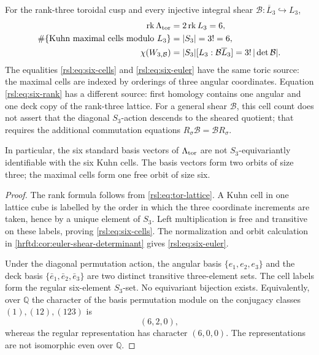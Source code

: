 \begin{theorem}
\label{rsl:thm:three-sixes}
For the rank-three toroidal cusp and every injective integral shear
\(\mathcal B:\overline L_3\hookrightarrow L_3\),
\begin{align}
 \operatorname{rk}\Lambda_{\rm tor}&=2\operatorname{rk}L_3=6,
 \label{rsl:eq:six-rank}\\
 \#\{\text{Kuhn maximal cells modulo }L_3\}&=|S_3|=3!=6,
 \label{rsl:eq:six-cells}\\
 \chi(W_{3,\mathcal B})
 &=|S_3|[L_3:\mathcal B\overline L_3]
   =3!\,|\det\mathcal B|.
 \label{rsl:eq:six-euler}
\end{align}
The equalities \eqref{rsl:eq:six-cells} and \eqref{rsl:eq:six-euler} have the
same toric source: the maximal cells are indexed by orderings of three angular
coordinates.  Equation \eqref{rsl:eq:six-rank} has a different source: first
homology contains one angular and one deck copy of the rank-three lattice.
For a general shear \(\mathcal B\), this cell count does not assert that the
diagonal \(S_3\)-action descends to the sheared quotient; that requires the
additional commutation equations
\(R_\sigma\mathcal B=\mathcal B R_\sigma\).

In particular, the six standard basis vectors of \(\Lambda_{\rm tor}\) are
not \(S_3\)-equivariantly identifiable with the six Kuhn cells.  The basis
vectors form two orbits of size three; the maximal cells form one free orbit
of size six.
\end{theorem}

\begin{proof}
The rank formula follows from \eqref{rsl:eq:tor-lattice}.  A Kuhn cell in one
lattice cube is labelled by the order in which the three coordinate
increments are taken, hence by a unique element of \(S_3\).  Left
multiplication is free and transitive on these labels, proving
\eqref{rsl:eq:six-cells}.  The normalization and orbit calculation in
\cref{hrftd:cor:euler-shear-determinant} gives
\eqref{rsl:eq:six-euler}.

Under the diagonal permutation action, the angular basis
\(\{e_1,e_2,e_3\}\) and the deck basis
\(\{\bar e_1,\bar e_2,\bar e_3\}\) are two distinct transitive three-element
sets.  The cell labels form the regular six-element \(S_3\)-set.  No
equivariant bijection exists.  Equivalently, over \(\mathbb Q\) the character
of the basis permutation module on the conjugacy classes
\((1),(12),(123)\) is
\[
 (6,2,0),
\]
whereas the regular representation has character \((6,0,0)\).  The
representations are not isomorphic even over \(\mathbb Q\).
\end{proof}

